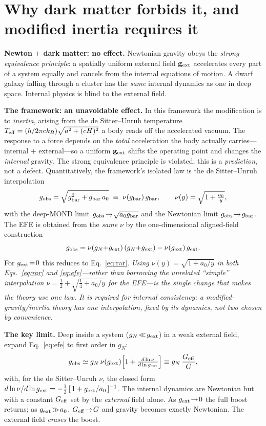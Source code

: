 \documentclass[aps,prd,twocolumn,10pt,nofootinbib]{revtex4-2}
\begin{document}
\section{Why dark matter forbids it, and modified inertia requires it}
\textbf{Newton $+$ dark matter: no effect.} Newtonian gravity obeys the \emph{strong equivalence principle}: a
spatially uniform external field $\mathbf{g}_{\rm ext}$ accelerates every part of a system equally and cancels
from the internal equations of motion. A dwarf galaxy falling through a cluster has the \emph{same} internal
dynamics as one in deep space. Internal physics is blind to the external field.

\textbf{The framework: an unavoidable effect.} In this framework the modification is to \emph{inertia}, arising
from the de Sitter--Unruh temperature $T_{\rm eff}=(\hbar/2\pi c k_B)\sqrt{a^2+(cH)^2}$ a body reads off the
accelerated vacuum. The response to a force depends on the \emph{total} acceleration the body actually carries---
internal $+$ external---so a uniform $\mathbf{g}_{\rm ext}$ shifts the operating point and changes the
\emph{internal} gravity. The strong equivalence principle is violated; this is a \emph{prediction}, not a defect.
Quantitatively, the framework's isolated law is the de Sitter--Unruh interpolation
\begin{equation}
g_{\rm obs}=\sqrt{g_{\rm bar}^2+g_{\rm bar}\,a_0}\;\equiv\;\nu(g_{\rm bar})\,g_{\rm bar},
\qquad \nu(y)=\sqrt{1+\tfrac{a_0}{y}},
\label{eq:rar}
\end{equation}
with the deep-MOND limit $g_{\rm obs}\!\to\!\sqrt{a_0 g_{\rm bar}}$ and the Newtonian limit $g_{\rm obs}\!\to\!
g_{\rm bar}$. The EFE is obtained from the \emph{same} $\nu$ by the one-dimensional aligned-field construction
\begin{equation}
g_{\rm obs}=\nu(g_N{+}g_{\rm ext})\,(g_N{+}g_{\rm ext})-\nu(g_{\rm ext})\,g_{\rm ext}.
\label{eq:efe}
\end{equation}
For $g_{\rm ext}\!=\!0$ this reduces to Eq.~\eqref{eq:rar}. \emph{Using $\nu(y)=\sqrt{1+a_0/y}$ in both
Eqs.~\eqref{eq:rar} and \eqref{eq:efe}---rather than borrowing the unrelated ``simple'' interpolation
$\nu=\tfrac12+\sqrt{\tfrac14+a_0/y}$ for the EFE---is the single change that makes the theory use one law. It is
required for internal consistency: a modified-gravity/inertia theory has one interpolation, fixed by its
dynamics, not two chosen by convenience.}

\textbf{The key limit.} Deep inside a system ($g_N\!\ll\!g_{\rm ext}$) in a weak external field, expand
Eq.~\eqref{eq:efe} to first order in $g_N$:
\begin{equation}
g_{\rm obs}\simeq g_N\,\nu(g_{\rm ext})\Big[1+\tfrac{d\ln\nu}{d\ln g_{\rm ext}}\Big]\equiv g_N\,\frac{G_{\rm
eff}}{G},
\label{eq:geff}
\end{equation}
with, for the de Sitter--Unruh $\nu$, the closed form $d\ln\nu/d\ln g_{\rm ext}=-\tfrac12\,[\,1+g_{\rm
ext}/a_0\,]^{-1}$. The internal dynamics are Newtonian but with a constant $G_{\rm eff}$ set by the
\emph{external} field alone. As $g_{\rm ext}\!\to\!0$ the full boost returns; as $g_{\rm ext}\!\gg\!a_0$,
$G_{\rm eff}\!\to\!G$ and gravity becomes exactly Newtonian. The external field \emph{erases} the boost.
\end{document}
